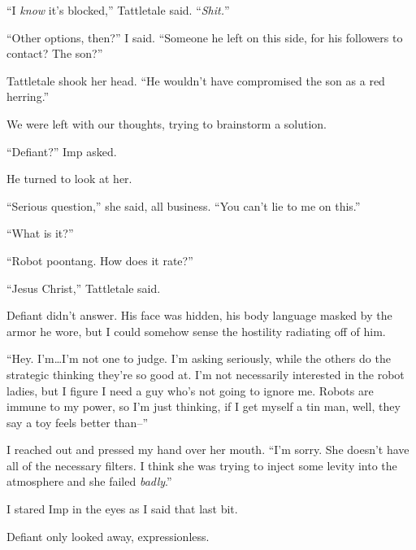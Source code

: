 ``I \emph{know} it's blocked,'' Tattletale said.  ``\emph{Shit.}''



``Other options, then?'' I said.  ``Someone he left on this side, for his followers to contact?  The son?''



Tattletale shook her head.  ``He wouldn't have compromised the son as a red herring.''



We were left with our thoughts, trying to brainstorm a solution.



``Defiant?'' Imp asked.



He turned to look at her.



``Serious question,'' she said, all business.  ``You can't lie to me on this.''



``What is it?''



``Robot poontang.  How does it rate?''



``Jesus Christ,'' Tattletale said.



Defiant didn't answer.  His face was hidden, his body language masked by the armor he wore, but I could somehow sense the hostility radiating off of him.



``Hey.  I'm\ldots I'm not one to judge.  I'm asking seriously, while the others do the strategic thinking they're so good at.  I'm not necessarily interested in the robot ladies, but I figure I need a guy who's not going to ignore me.  Robots are immune to my power, so I'm just thinking, if I get myself a tin man, well, they say a toy feels better than--''



I reached out and pressed my hand over her mouth.  ``I'm sorry.  She doesn't have all of the necessary filters.  I think she was trying to inject some levity into the atmosphere and she failed \emph{badly}.''



I stared Imp in the eyes as I said that last bit.



Defiant only looked away, expressionless.



